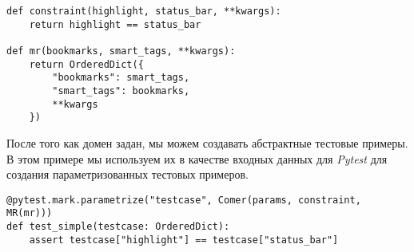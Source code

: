 \begin{lstlisting}[label={lst:test-case3}]
def constraint(highlight, status_bar, **kwargs):
	return highlight == status_bar

def mr(bookmarks, smart_tags, **kwargs):
	return OrderedDict({
		"bookmarks": smart_tags,
		"smart_tags": bookmarks,
		**kwargs
	})
\end{lstlisting}

После того как домен задан, мы можем создавать абстрактные тестовые примеры. В этом примере мы используем их в качестве входных данных для \textit{Pytest} для создания параметризованных тестовых примеров.

\begin{lstlisting}[label={lst:test-case4}]
@pytest.mark.parametrize("testcase", Comer(params, constraint, MR(mr)))
def test_simple(testcase: OrderedDict):
	assert testcase["highlight"] == testcase["status_bar"]
\end{lstlisting}
